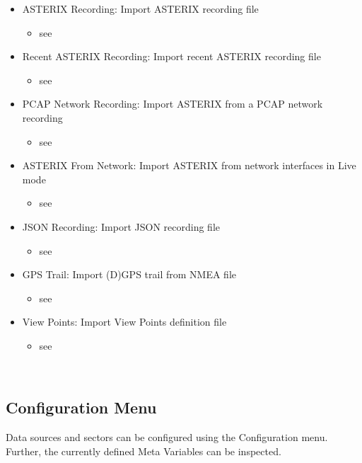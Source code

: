 \begin{itemize}
 \item ASTERIX Recording: Import ASTERIX recording file
 \begin{itemize}
 \item see 
 \end{itemize}
 \item Recent ASTERIX Recording: Import recent ASTERIX recording file
  \begin{itemize}
 \item see 
 \end{itemize}
 \item PCAP Network Recording: Import ASTERIX from a PCAP network recording
  \begin{itemize}
 \item see 
 \end{itemize}
 \item ASTERIX From Network: Import ASTERIX from network interfaces in Live mode
  \begin{itemize}
 \item see 
 \end{itemize}
 \item JSON Recording: Import JSON recording file
  \begin{itemize}
 \item see 
 \end{itemize}
 \item GPS Trail: Import (D)GPS trail from NMEA file
  \begin{itemize}
 \item see 
 \end{itemize}
 \item View Points: Import View Points definition file
  \begin{itemize}
 \item see 
 \end{itemize}
\end{itemize}
\  \\

\subsection{Configuration Menu}
\label{sec:ui_overview_config_menu}

Data sources and sectors can be configured using the Configuration menu. Further, the currently defined Meta Variables can be inspected.

